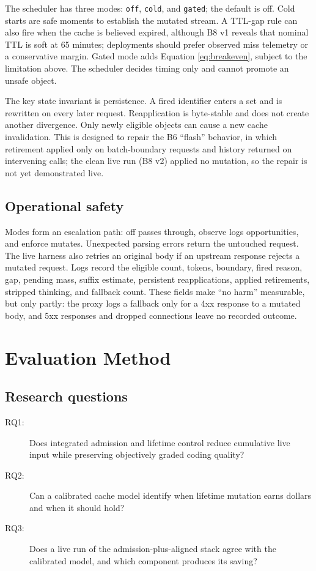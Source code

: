 \documentclass[10pt,twocolumn]{article}
\begin{document}
The scheduler has three modes: \texttt{off}, \texttt{cold}, and \texttt{gated}; the default is off.
Cold starts are safe moments to establish the mutated stream.  A TTL-gap rule can also fire when the
cache is believed expired, although B8 v1 reveals that nominal TTL is soft at 65 minutes; deployments
should prefer observed miss telemetry or a conservative margin.  Gated mode adds Equation
\ref{eq:breakeven}, subject to the limitation above.  The scheduler decides timing only and cannot
promote an unsafe object.

The key state invariant is persistence.  A fired identifier enters a set and is rewritten on every
later request.  Reapplication is byte-stable and does not create another divergence.  Only newly
eligible objects can cause a new cache invalidation.  This is designed to repair the B6 ``flash''
behavior, in which retirement applied only on batch-boundary requests and history returned on
intervening calls; the clean live run (B8 v2) applied no mutation, so the repair is not yet
demonstrated live.

\subsection{Operational safety}

Modes form an escalation path: off passes through, observe logs opportunities, and enforce mutates.
Unexpected parsing errors return the untouched request.  The live harness also retries an original
body if an upstream response rejects a mutated request.  Logs record the eligible count, tokens,
boundary, fired reason, gap, pending mass, suffix estimate, persistent reapplications, applied
retirements, stripped thinking, and fallback count.  These fields make ``no harm'' measurable, but only
partly: the proxy logs a fallback only for a 4xx response to a mutated body, and 5xx responses and
dropped connections leave no recorded outcome.

\section{Evaluation Method}

\subsection{Research questions}

\begin{description}
  \item[RQ1:] Does integrated admission and lifetime control reduce cumulative live input while
  preserving objectively graded coding quality?
  \item[RQ2:] Can a calibrated cache model identify when lifetime mutation earns dollars and when it
  should hold?
  \item[RQ3:] Does a live run of the admission-plus-aligned stack agree with the calibrated model, and
  which component produces its saving?
\end{description}
\end{document}
